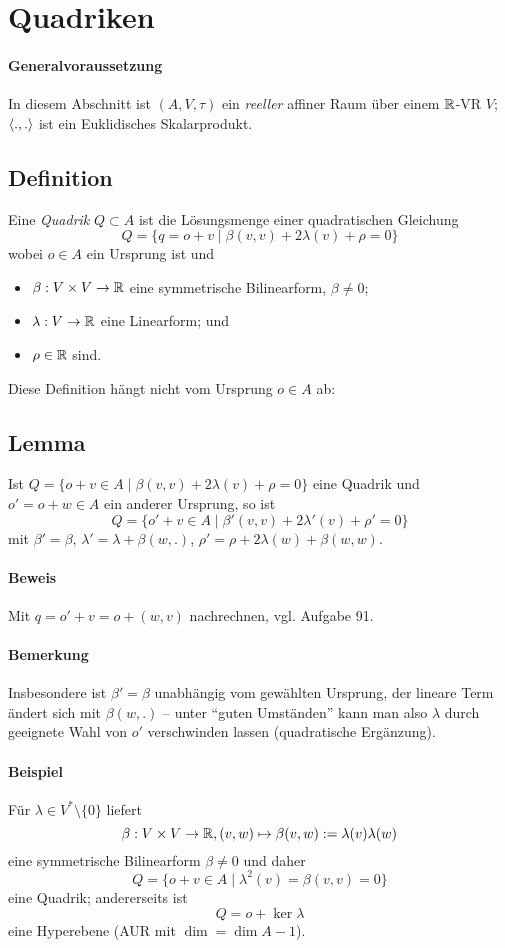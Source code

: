 \section{Quadriken}
\paragraph{Generalvoraussetzung}
	In diesem Abschnitt ist $ (A,V,\tau) $ ein \emph{reeller} affiner Raum über einem $ \mathbb{R} $-VR $ V $; $ \langle .,. \rangle $ ist ein Euklidisches Skalarprodukt.
\subsection{Definition}
	Eine \emph{Quadrik} $ Q\subset A $ ist die Lösungsmenge einer quadratischen Gleichung
		\[ Q = \{q=o+v\mid \beta(v,v)+2\lambda(v)+\rho = 0 \} \]
	wobei $ o\in A $ ein Ursprung ist und
	\begin{itemize}
		\item $ \beta: V\times V\to \mathbb{R} $ eine symmetrische Bilinearform, $ \beta \neq 0 $;
		\item $ \lambda: V\to \mathbb{R} $ eine Linearform; und
		\item $ \rho \in \mathbb{R}$ sind.
	\end{itemize}
	Diese Definition hängt nicht vom Ursprung $ o\in A $ ab:
\subsection{Lemma}
	Ist $ Q=\{o+v\in A \mid \beta(v,v)+2\lambda(v)+\rho=0 \} $ eine Quadrik und $ o' = o+w\in A $ ein anderer Ursprung, so ist
		\[ Q=\{o'+v\in A\mid \beta'(v,v)+2\lambda'(v)+\rho'=0 \} \]
	mit $ \beta'=\beta $, $ \lambda'=\lambda+\beta(w,.) $, $ \rho' = \rho+2\lambda(w)+\beta(w,w) $.
\paragraph{Beweis}
	Mit $ q=o'+v=o+(w,v) $ nachrechnen, vgl. Aufgabe 91.
\paragraph{Bemerkung}
	Insbesondere ist $ \beta' = \beta $ unabhängig vom gewählten Ursprung, der lineare Term ändert sich mit $ \beta(w,.) $ -- unter "`guten Umständen"' kann man also $ \lambda $ durch geeignete Wahl von $ o' $ verschwinden lassen (quadratische Ergänzung).
\paragraph{Beispiel}
	Für $ \lambda\in V^*\setminus\{0\} $ liefert
		\[ \beta:V\times V\to \mathbb{R}, (v,w)\mapsto \beta(v,w):=\lambda(v)\lambda(w) \]
	eine symmetrische Bilinearform $ \beta\neq 0 $ und daher
		\[ Q=\{o+v\in A\mid \lambda^2(v)=\beta(v,v) = 0 \} \]
	eine Quadrik; andererseits ist 
		\[ Q = o+\ker \lambda \]
	eine Hyperebene (AUR mit $ \dim = \dim A-1 $).
